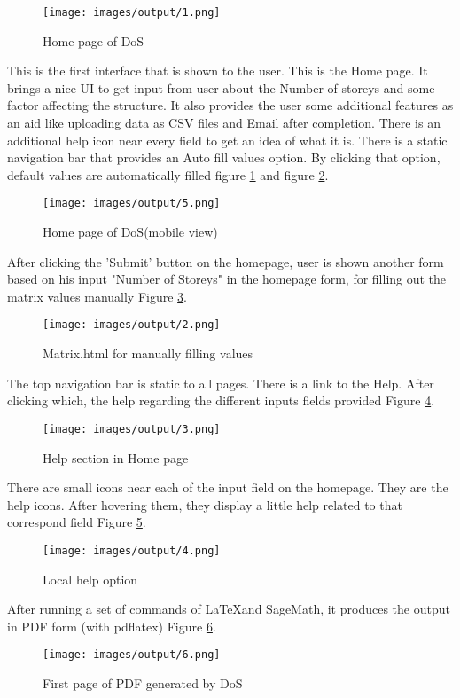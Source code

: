 \begin{figure}[H] 
\centering \texttt{[image: images/output/1.png]}
\caption{Home page of DoS}
\label{fig:1}
\end{figure}
This is the first interface that is shown to the user. This is the Home page.
It brings a nice UI to get input from user about the Number of storeys and 
some factor affecting the structure. It also provides the user some 
additional features as an aid like uploading data as CSV files and Email 
after completion. There is an additional help icon near every field to get 
an idea of what it is. There is a static navigation bar that provides an 
Auto fill values option. By clicking that option, default values are 
automatically filled figure \ref{fig:1} and figure \ref{fig:9}.
\begin{figure}[H] 
\centering \texttt{[image: images/output/5.png]}
\caption{Home page of DoS(mobile view)}
\label{fig:9}
\end{figure}  


After clicking the 'Submit' button on the homepage, user is shown another 
form based on his input "Number of Storeys" in the homepage form, for 
filling out the matrix values manually Figure \ref{fig:2}.

\begin{figure}[H] 
\centering \texttt{[image: images/output/2.png]}
\caption{Matrix.html for manually filling values}
\label{fig:2}
\end{figure}

The top navigation bar is static to all pages. There is a link to the Help. 
After clicking which, the help regarding the different inputs fields 
provided Figure \ref{fig:3}.

\begin{figure}[H] 
\centering \texttt{[image: images/output/3.png]}
\caption{Help section in Home page}
\label{fig:3}
\end{figure}

There are small icons near each of the input field on the homepage. They are 
the help icons. After hovering them, they display a little help related to
that correspond field Figure \ref{fig:4}.
\begin{figure}[H] 
\centering \texttt{[image: images/output/4.png]}
\caption{Local help option}
\label{fig:4}
\end{figure}

After running a set of commands of \LaTeX and SageMath, it produces the
output in PDF form (with pdflatex) Figure \ref{fig:5}.
\begin{figure}[H] 
\centering \texttt{[image: images/output/6.png]}
\caption{First page of PDF generated by DoS}
\label{fig:5}
\end{figure}

